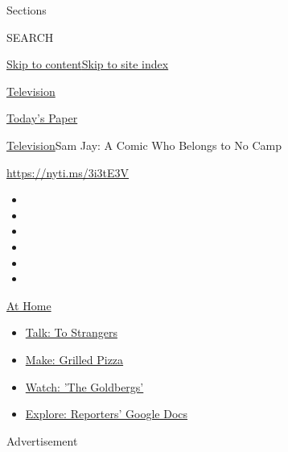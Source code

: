 Sections

SEARCH

\protect\hyperlink{site-content}{Skip to
content}\protect\hyperlink{site-index}{Skip to site index}

\href{https://www.nytimes.com/section/arts/television}{Television}

\href{https://myaccount.nytimes.com/auth/login?response_type=cookie\&client_id=vi}{}

\href{https://www.nytimes.com/section/todayspaper}{Today's Paper}

\href{/section/arts/television}{Television}\textbar{}Sam Jay: A Comic
Who Belongs to No Camp

\url{https://nyti.ms/3i3tE3V}

\begin{itemize}
\item
\item
\item
\item
\item
\item
\end{itemize}

\href{https://www.nytimes.com/spotlight/at-home?action=click\&pgtype=Article\&state=default\&region=TOP_BANNER\&context=at_home_menu}{At
Home}

\begin{itemize}
\tightlist
\item
  \href{https://www.nytimes.com/2020/08/03/well/family/the-benefits-of-talking-to-strangers.html?action=click\&pgtype=Article\&state=default\&region=TOP_BANNER\&context=at_home_menu}{Talk:
  To Strangers}
\item
  \href{https://www.nytimes.com/2020/08/01/at-home/coronavirus-make-pizza-on-a-grill.html?action=click\&pgtype=Article\&state=default\&region=TOP_BANNER\&context=at_home_menu}{Make:
  Grilled Pizza}
\item
  \href{https://www.nytimes.com/2020/07/31/arts/television/goldbergs-abc-stream.html?action=click\&pgtype=Article\&state=default\&region=TOP_BANNER\&context=at_home_menu}{Watch:
  'The Goldbergs'}
\item
  \href{https://www.nytimes.com/interactive/2020/at-home/even-more-reporters-editors-diaries-lists-recommendations.html?action=click\&pgtype=Article\&state=default\&region=TOP_BANNER\&context=at_home_menu}{Explore:
  Reporters' Google Docs}
\end{itemize}

Advertisement

